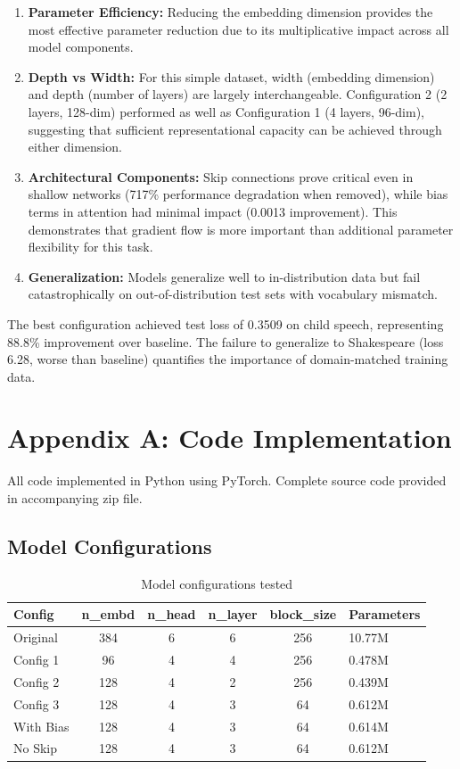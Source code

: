 \documentclass[11pt]{article}
\begin{document}
\begin{enumerate}
    \item \textbf{Parameter Efficiency:} Reducing the embedding dimension provides the most effective parameter reduction due to its multiplicative impact across all model components.
    
    \item \textbf{Depth vs Width:} For this simple dataset, width (embedding dimension) and depth (number of layers) are largely interchangeable. Configuration 2 (2 layers, 128-dim) performed as well as Configuration 1 (4 layers, 96-dim), suggesting that sufficient representational capacity can be achieved through either dimension.
    
    \item \textbf{Architectural Components:} Skip connections prove critical even in shallow networks (717\% performance degradation when removed), while bias terms in attention had minimal impact (0.0013 improvement). This demonstrates that gradient flow is more important than additional parameter flexibility for this task.
    
    \item \textbf{Generalization:} Models generalize well to in-distribution data but fail catastrophically on out-of-distribution test sets with vocabulary mismatch.
\end{enumerate}

The best configuration achieved test loss of 0.3509 on child speech, representing 88.8\% improvement over baseline. The failure to generalize to Shakespeare (loss 6.28, worse than baseline) quantifies the importance of domain-matched training data.

\appendix

\section*{Appendix A: Code Implementation}

All code implemented in Python using PyTorch. Complete source code provided in accompanying zip file.

\subsection*{Model Configurations}

\begin{table}[h]
\centering
\begin{tabular}{@{}lcccc@{}}
\toprule
Config & n\_embd & n\_head & n\_layer & block\_size & Parameters \\ \midrule
Original & 384 & 6 & 6 & 256 & 10.77M \\
Config 1 & 96 & 4 & 4 & 256 & 0.478M \\
Config 2 & 128 & 4 & 2 & 256 & 0.439M \\
Config 3 & 128 & 4 & 3 & 64 & 0.612M \\
With Bias & 128 & 4 & 3 & 64 & 0.614M \\
No Skip & 128 & 4 & 3 & 64 & 0.612M \\ \bottomrule
\end{tabular}
\caption{Model configurations tested}
\end{table}
\end{document}
